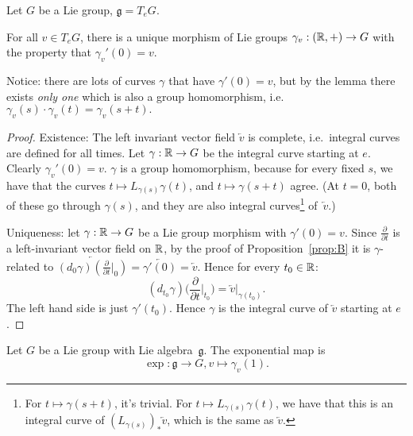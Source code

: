 Let $G$ be a Lie group, $\mathfrak g = T_e G$.

\begin{lemma}    
    For all $v \in T_e G$, there is a unique morphism of Lie groups $\gamma_v: (\mathbb{R}, +) \to  G$ with the property that $\gamma_v'(0) = v$.
   \end{lemma}
Notice:   there are lots of curves $\gamma$ that have $\gamma'(0) = v$, but by the lemma there exists \emph{only one} which is also a group homomorphism, i.e.
    $
        \gamma_v(s) \cdot \gamma_v(t) = \gamma_v(s + t)
    .$ 

\begin{proof}
    Existence: The left invariant vector field $\overleftarrow{v}$ is complete, i.e.\ integral curves are defined for all times.  
    Let $ \gamma: \mathbb{R} \to  G $ be the integral curve starting at $e$.
    Clearly $\gamma_v'(0) = v$.   $\gamma$ is a group homomorphism, because for every fixed $s$, we have that  the curves $t \mapsto  L_{\gamma(s)} \gamma(t)$, and $t \mapsto  \gamma(s+t)$ agree.
    (At $t = 0$, both of these go through $\gamma(s)$, and they are also integral curves\footnote{For $t \mapsto  \gamma(s+t)$, it's trivial. For $t \mapsto  L_{\gamma(s)} \gamma(t)$, we have that this is an integral curve of  $(L_{\gamma(s)})_*\overleftarrow{v}$, which is the same as $\overleftarrow{v}$.} of~$\overleftarrow{v}$.)

    Uniqueness: let  $ \gamma: \mathbb{R} \to  G $ be a Lie group morphism with $\gamma'(0) = v$. Since $\frac{\partial}{\partial t}$ is a left-invariant vector field on $\mathbb{R}$, by the proof of Proposition~\ref{prop:B} it is $\gamma$-related to $\overleftarrow{(d_0\gamma)(\frac{\partial}{\partial t}|_0)}=\overleftarrow{\gamma'(0)}=\overleftarrow{v}.$ Hence for every $t_0\in \mathbb{R}$:
 $$(d_{t_0}\gamma)\Big(\frac{\partial}{\partial t}\Big|_{t_0}\Big)  =\overleftarrow{v}|_{\gamma(t_0)}.$$ The left hand side is just
  $\gamma'(t_0)$. Hence $\gamma$ is  {the} integral curve of   $\overleftarrow{v}$ starting at $e$.
\end{proof}
\begin{definition}
    Let $G$ be a Lie group with Lie algebra~$\mathfrak g$.
    The exponential map is
    \[
        \exp: \mathfrak g \to  G, v \mapsto \gamma_v(1)
    .\] 
\end{definition}
